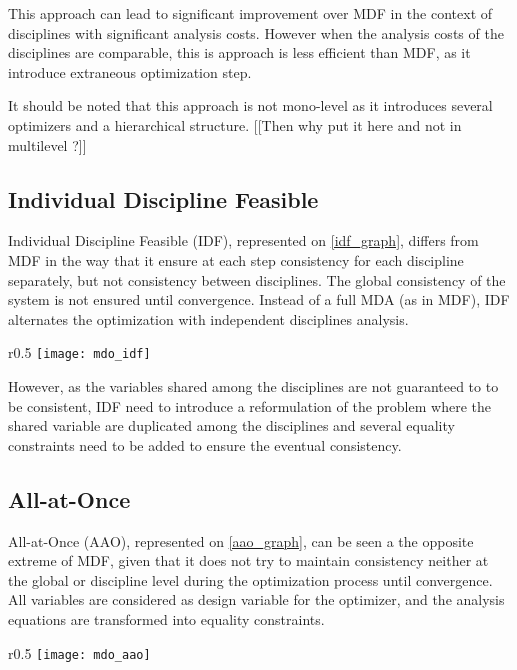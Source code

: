 This approach can lead to significant improvement over MDF in the context of disciplines with significant analysis costs. However when the analysis costs of the disciplines are comparable, this is approach is less efficient than MDF, as it introduce extraneous optimization step.

It should be noted that this approach is not mono-level as it introduces several optimizers and a hierarchical structure. [[Then why put it here and not in multilevel ?]] 

\subsection{Individual Discipline Feasible}

Individual Discipline Feasible (IDF), represented on \figurename{} \ref{idf_graph}, differs from MDF in the way that it ensure at each step consistency for each discipline separately, but not consistency between disciplines. The global consistency of the system is not ensured until convergence.
Instead of a full MDA (as in MDF), IDF alternates the optimization with independent disciplines analysis.

\begin{wrapfigure}{r}{0.5\textwidth}
\centering
\texttt{[image: mdo\_idf]}
\caption{IDF method}\label{idf_graph}
\end{wrapfigure}

However, as the variables shared among the disciplines are not guaranteed to to be consistent, IDF need to introduce a reformulation of the problem where the shared variable are duplicated among the disciplines and several equality constraints need to be added to ensure the eventual consistency.

\subsection{All-at-Once}

All-at-Once (AAO), represented on \figurename{} \ref{aao_graph}, can be seen a the opposite extreme of MDF, given that it does not try to maintain consistency neither at the global or discipline level during the optimization process until convergence.
All variables are considered as design variable for the optimizer, and the analysis equations are transformed into equality constraints.

\begin{wrapfigure}{r}{0.5\textwidth}
\centering
\texttt{[image: mdo\_aao]}
\caption{AAO method}\label{aao_graph}
\end{wrapfigure}

